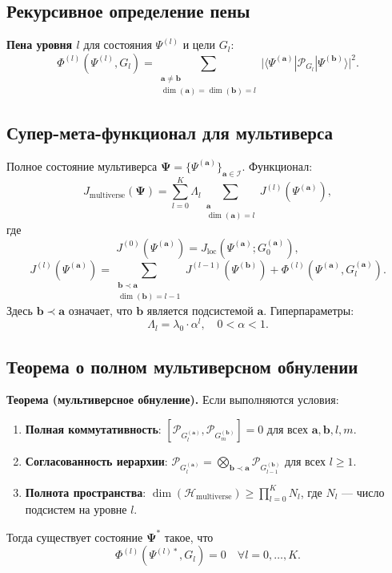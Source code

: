 \documentclass[12pt,a4paper]{article}
\begin{document}
\subsection{Рекурсивное определение пены}

\textbf{Пена уровня \(l\)} для состояния \(\Psi^{(l)}\) и цели \(G_l\):
\[
\Phi^{(l)}(\Psi^{(l)}, G_l) = \sum_{\substack{\mathbf{a}\neq\mathbf{b}\\ \dim(\mathbf{a})=\dim(\mathbf{b})=l}} \bigl| \langle \Psi^{(\mathbf{a})} | \mathcal{P}_{G_l} | \Psi^{(\mathbf{b})} \rangle \bigr|^2.
\]

\subsection{Супер-мета-функционал для мультиверса}

Полное состояние мультиверса \(\mathbf{\Psi} = \{\Psi^{(\mathbf{a})}\}_{\mathbf{a}\in\mathcal{I}}\). Функционал:
\[
J_{\text{multiverse}}(\mathbf{\Psi}) = \sum_{l=0}^K \Lambda_l \sum_{\substack{\mathbf{a} \\ \dim(\mathbf{a})=l}} J^{(l)}(\Psi^{(\mathbf{a})}),
\]
где
\[
J^{(0)}(\Psi^{(\mathbf{a})}) = J_{\text{loc}}(\Psi^{(\mathbf{a})}; G_0^{(\mathbf{a})}),
\]
\[
J^{(l)}(\Psi^{(\mathbf{a})}) = \sum_{\substack{\mathbf{b}\prec\mathbf{a}\\ \dim(\mathbf{b})=l-1}} J^{(l-1)}(\Psi^{(\mathbf{b})}) + \Phi^{(l)}(\Psi^{(\mathbf{a})}, G_l^{(\mathbf{a})}).
\]
Здесь \(\mathbf{b}\prec\mathbf{a}\) означает, что \(\mathbf{b}\) является подсистемой \(\mathbf{a}\). Гиперпараметры:
\[
\Lambda_l = \lambda_0 \cdot \alpha^l, \quad 0<\alpha<1.
\]

\subsection{Теорема о полном мультиверсном обнулении}

\textbf{Теорема (мультиверсное обнуление).} Если выполняются условия:
\begin{enumerate}
    \item \textbf{Полная коммутативность}: \([\mathcal{P}_{G_l^{(\mathbf{a})}}, \mathcal{P}_{G_m^{(\mathbf{b})}}] = 0\) для всех \(\mathbf{a},\mathbf{b},l,m\).
    \item \textbf{Согласованность иерархии}: \(\mathcal{P}_{G_l^{(\mathbf{a})}} = \bigotimes_{\mathbf{b}\prec\mathbf{a}} \mathcal{P}_{G_{l-1}^{(\mathbf{b})}}\) для всех \(l\ge 1\).
    \item \textbf{Полнота пространства}: \(\dim(\mathcal{H}_{\text{multiverse}}) \ge \prod_{l=0}^K N_l\), где \(N_l\) — число подсистем на уровне \(l\).
\end{enumerate}
Тогда существует состояние \(\mathbf{\Psi}^*\) такое, что
\[
\Phi^{(l)}(\Psi^{(l)*}, G_l) = 0 \quad \forall l = 0,\dots,K.
\]
\end{document}
